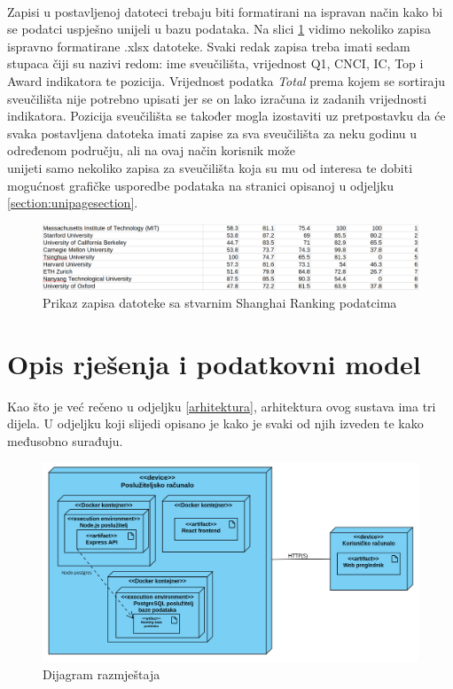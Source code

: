 \documentclass[times, utf8, zavrsni]{fer}
\begin{document}
\\Zapisi u postavljenoj datoteci trebaju biti formatirani na ispravan način kako bi se podatci uspješno unijeli u bazu podataka. 
Na slici \ref{fig:real} vidimo nekoliko zapisa ispravno formatirane .xlsx datoteke. Svaki redak zapisa treba imati sedam stupaca čiji su nazivi redom:
ime sveučilišta, vrijednost Q1, CNCI, IC, Top i Award indikatora te pozicija. Vrijednost podatka \emph{Total} prema kojem se sortiraju 
sveučilišta nije potrebno upisati jer se on lako izračuna iz zadanih vrijednosti indikatora. Pozicija sveučilišta se također mogla
izostaviti uz pretpostavku da će svaka postavljena datoteka imati zapise za sva sveučilišta za neku godinu u određenom području, ali
na ovaj način korisnik može \\unijeti samo nekoliko zapisa za sveučilišta koja su mu od interesa te dobiti mogućnost 
grafičke usporedbe podataka na stranici opisanoj u odjeljku \ref{section:unipagesection}.
\begin{figure}[htb]
    \hspace*{-2cm} 
       \includegraphics[scale=0.3]{real.png} 
       \caption{Prikaz zapisa datoteke sa stvarnim Shanghai Ranking podatcima}
       \label{fig:real}
       \end{figure}  

\chapter{Opis rješenja i podatkovni model}
Kao što je već rečeno u odjeljku \ref{arhitektura}, arhitektura ovog sustava ima tri dijela. U odjeljku koji slijedi opisano je kako je svaki od njih izveden
te kako međusobno surađuju.
\begin{figure}[htb]
    \hspace*{-2.5cm} 
       \includegraphics[scale=0.3]{razmjestaj.png} 
       \caption{Dijagram razmještaja}
       \label{fig:razmjestaj}
       \end{figure}  
\end{document}
